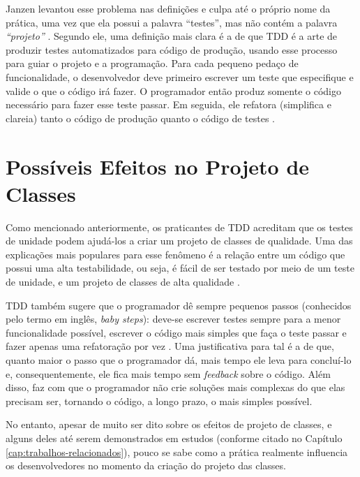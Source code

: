 Janzen levantou esse problema nas definições e culpa até o próprio nome da prática, uma vez
que ela possui a palavra ``testes'', mas não contém a palavra \textit{``projeto''} 
\cite{tdd-really-improve}.
Segundo ele, uma definição mais clara é a de que TDD é a arte de produzir testes
automatizados para código de produção, usando esse processo para guiar o projeto e a programação.
Para cada pequeno pedaço de funcionalidade, o desenvolvedor deve primeiro
escrever um teste que especifique e valide o que o código irá fazer. O
programador então produz somente o código necessário para fazer esse teste
passar. Em seguida, ele refatora (simplifica e clareia) tanto o código de produção
quanto o código de testes \cite{agilealliance-tdd} \cite{tdd-taxonomy}.

\section{Possíveis Efeitos no Projeto de Classes}

Como mencionado anteriormente, os praticantes de TDD acreditam que os testes de unidade
podem ajudá-los a criar um projeto de classes de qualidade. Uma das explicações mais
populares para esse fenômeno é a relação
entre um código que possui uma alta testabilidade, ou seja, é fácil de ser testado
por meio de um teste de unidade, e um projeto de classes de alta qualidade \cite{feathers-synergy}.

TDD também sugere que o programador dê sempre pequenos passos (conhecidos pelo termo em
inglês, \textit{baby steps}): deve-se escrever testes sempre para a menor
funcionalidade possível, escrever o código mais simples que faça o teste passar
e fazer apenas uma refatoração por vez \cite{TDDByExample}.
Uma justificativa para tal é a de que, quanto maior o passo que o programador dá, mais
tempo ele leva para concluí-lo e, consequentemente, ele fica mais tempo
sem \textit{feedback} sobre o código. Além disso, faz com que o programador não crie
soluções mais complexas do que elas precisam ser, tornando o código, a longo
prazo, o mais simples possível.

No entanto, apesar de muito ser dito sobre os efeitos de projeto de classes, e alguns deles
até serem demonstrados em estudos (conforme citado no Capítulo \ref{cap:trabalhos-relacionados}), 
pouco se sabe como a prática realmente influencia os desenvolvedores no momento da criação do
projeto das classes.

